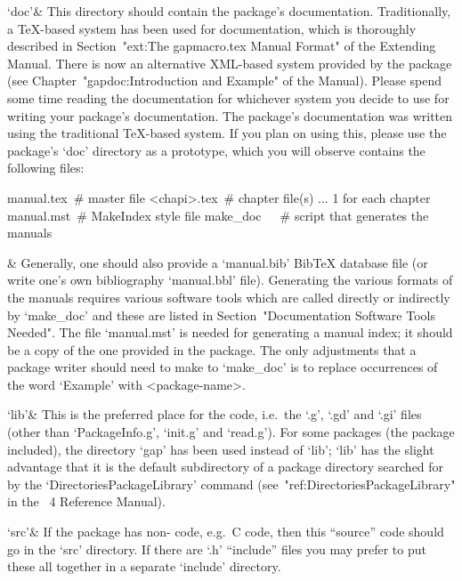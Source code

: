 `doc'&
This directory should contain the package's documentation. Traditionally,
a {\TeX}-based system has been used for {\GAP}  documentation,  which  is
thoroughly described in Section~"ext:The gapmacro.tex Manual  Format"  of
the Extending {\GAP} Manual. There is now an alternative XML-based system
provided    by    the    {\GAP}     package          (see
Chapter~"gapdoc:Introduction  and  Example"   of   the   
Manual). Please spend some time reading the documentation  for  whichever
system you decide to use for writing your  package's  documentation.  The
{\Example} package's documentation  was  written  using  the  traditional
{\TeX}-based system. If you plan on using this, please use the {\Example}
package's `doc' directory as a prototype, which you will observe contains
the following files:

manual.tex\ \# master file
<chapi>.tex\ \# chapter file(s) ... 1 for each chapter
manual.mst\ \# MakeIndex style file
make_doc\ \ \ \# script that generates the manuals

&
Generally, one should also provide a `manual.bib' Bib{\TeX} database file
(or write one's  own  bibliography  `manual.bbl'  file).  Generating  the
various formats of the manuals requires various software tools which  are
called directly or indirectly by  `make_doc'  and  these  are  listed  in
Section~"Documentation Software Tools Needed". The file  `manual.mst'  is
needed for generating a manual index; it should be  a  copy  of  the  one
provided in the {\Example} package. The only adjustments that  a  package
writer should need to make to `make_doc' is to replace occurrences of the
word `Example' with <package-name>.

`lib'&
This is the preferred place for the {\GAP} code, i.e.~the `.g', `.gd' and
`.gi' files (other than `PackageInfo.g', `init.g' and `read.g'). For some
packages (the {\Example} package included), the directory `gap' has  been
used instead of `lib'; `lib' has the slight  advantage  that  it  is  the
default  subdirectory  of  a  package  directory  searched  for  by   the
`DirectoriesPackageLibrary' command  (see~"ref:DirectoriesPackageLibrary"
in the {\GAP}~4 Reference Manual).

`src'&
If the package has non-{\GAP} code, e.g.~C  code,  then  this  ``source''
code should go in the `src' directory.  If  there  are  `.h'  ``include''
files you may prefer to put these all together in  a  separate  `include'
directory.

